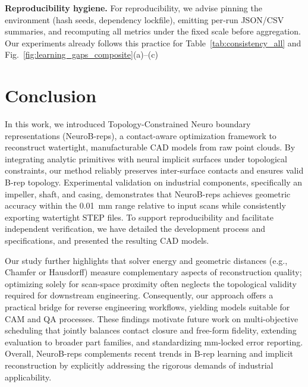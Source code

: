 \documentclass{ieeeaccess}
\begin{document}
\textbf{Reproducibility hygiene.} For reproducibility, we advise
pinning the environment (hash seeds, dependency lockfile), emitting
per‑run JSON/CSV summaries, and recomputing all metrics under the
fixed scale before aggregation. Our experiments already follows this
practice for Table~\ref{tab:consistency_all} and Fig.~\ref{fig:learning_gaps_composite}(a)–(c)


\section{Conclusion}
In this work, we introduced Topology-Constrained Neuro boundary representations (NeuroB-reps), a contact-aware optimization framework to reconstruct watertight, manufacturable CAD models from raw point clouds. By integrating analytic primitives with neural implicit surfaces under topological constraints, our method reliably preserves inter-surface contacts and ensures valid B-rep topology. Experimental validation on industrial components, specifically an impeller, shaft, and casing, demonstrates that NeuroB-reps achieves geometric accuracy within the 0.01~mm range
 relative to input scans while consistently exporting watertight STEP files. To support reproducibility and facilitate independent verification, we have detailed the development process and specifications, and presented the resulting CAD models.

Our study further highlights that solver energy and geometric distances (e.g., Chamfer or Hausdorff) measure complementary aspects of reconstruction quality; optimizing solely for scan-space proximity often neglects the topological validity required for downstream engineering. Consequently, our approach offers a practical bridge for reverse engineering workflows, yielding models suitable for CAM and QA processes. These findings motivate future work on multi-objective scheduling that jointly balances contact closure and free-form fidelity, extending evaluation to broader part families, and standardizing mm-locked error reporting. Overall, NeuroB-reps complements recent trends in B-rep learning \cite{b3,b1,b4,b20} and implicit reconstruction \cite{b5,b6,b17,b21} by explicitly addressing the rigorous demands of industrial applicability.
\end{document}

